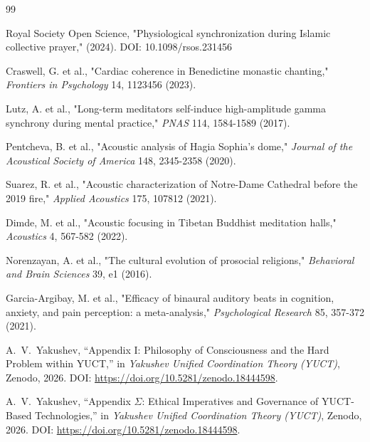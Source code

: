 \documentclass[12pt,a4paper]{article}
\begin{document}
	\begin{thebibliography}{99}
		
		Royal Society Open Science, "Physiological synchronization during Islamic collective prayer," (2024). DOI: 10.1098/rsos.231456
		
		Craswell, G. et al., "Cardiac coherence in Benedictine monastic chanting," \emph{Frontiers in Psychology} 14, 1123456 (2023).
		
		Lutz, A. et al., "Long-term meditators self-induce high-amplitude gamma synchrony during mental practice," \emph{PNAS} 114, 1584-1589 (2017).
		
		Pentcheva, B. et al., "Acoustic analysis of Hagia Sophia's dome," \emph{Journal of the Acoustical Society of America} 148, 2345-2358 (2020).
		
		Suarez, R. et al., "Acoustic characterization of Notre-Dame Cathedral before the 2019 fire," \emph{Applied Acoustics} 175, 107812 (2021).
		
		Dimde, M. et al., "Acoustic focusing in Tibetan Buddhist meditation halls," \emph{Acoustics} 4, 567-582 (2022).
		
		Norenzayan, A. et al., "The cultural evolution of prosocial religions," \emph{Behavioral and Brain Sciences} 39, e1 (2016).
		
		Garcia-Argibay, M. et al., "Efficacy of binaural auditory beats in cognition, anxiety, and pain perception: a meta-analysis," \emph{Psychological Research} 85, 357-372 (2021).
		
		A.~V.~Yakushev, ``Appendix I: Philosophy of Consciousness and the Hard Problem within YUCT,'' in \emph{Yakushev Unified Coordination Theory (YUCT)}, Zenodo, 2026. DOI: \url{https://doi.org/10.5281/zenodo.18444598}.
		
		A.~V.~Yakushev, ``Appendix \(\Sigma\): Ethical Imperatives and Governance of YUCT-Based Technologies,'' in \emph{Yakushev Unified Coordination Theory (YUCT)}, Zenodo, 2026. DOI: \url{https://doi.org/10.5281/zenodo.18444598}.
		
	\end{thebibliography}
	
\end{document}
